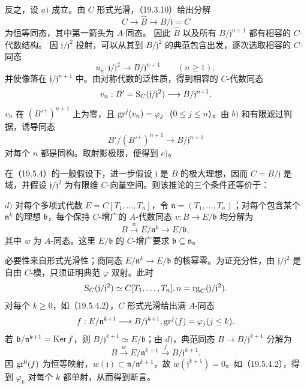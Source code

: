反之，设 $a)$ 成立。由 $C$ 形式光滑，（19.3.10）给出分解
\[
 C\longrightarrow\widehat B\longrightarrow B/\mathfrak j=C
\]
为恒等同态，其中第一箭头为 $A$-同态。
因此 $\widehat B$ 以及所有 $B/\mathfrak j^{n+1}$ 都有相容的 $C$-代数结构。
因 $\mathfrak j/\mathfrak j^2$ 投射，可以从其到 $B/\mathfrak j^2$ 的典范包含出发，逐次选取相容的 $C$-同态
\[
 u_n:\mathfrak j/\mathfrak j^2\longrightarrow B/\mathfrak j^{n+1}
 \qquad(n\geq1),
\]
并使像落在 $\mathfrak j/\mathfrak j^{n+1}$ 中。由对称代数的泛性质，得到相容的 $C$-代数同态
\[
 v_n:B'=\mathrm S_C(\mathfrak j/\mathfrak j^2)\longrightarrow B/\mathfrak j^{n+1}.
\]
$v_n$ 在 $(B'^+)^{n+1}$ 上为零，且 $\operatorname{gr}^j(v_n)=\varphi_j$（$0\leq j\leq n$）。由 $b)$ 和有限滤过判据，诱导同态
\[
 B'/(B'^+)^{n+1}\longrightarrow B/\mathfrak j^{n+1}
\]
对每个 $n$ 都是同构。取射影极限，便得到 $c)$。

在（19.5.4）的一般假设下，进一步假设 $\mathfrak j$ 是 $B$ 的极大理想，因而 $C=B/\mathfrak j$ 是域，并假设 $\mathfrak j/\mathfrak j^2$ 为有限维 $C$-向量空间。则该推论的三个条件还等价于：

$d)$ 对每个多项式代数 $E=C[T_1,\ldots,T_n]$，令 $\mathfrak n=(T_1,\ldots,T_n)$；对每个包含某个 $\mathfrak n^k$ 的理想 $\mathfrak b$，每个保持 $C$-增广的 $A$-代数同态 $v:B\to E/\mathfrak b$ 均分解为
\[
 B\xrightarrow{w}E/\mathfrak n^k\longrightarrow E/\mathfrak b,
\]
其中 $w$ 为 $A$-同态。这里 $E/\mathfrak b$ 的 $C$-增广要求 $\mathfrak b\subseteq\mathfrak n$。

必要性来自形式光滑性；商同态 $E/\mathfrak n^k\to E/\mathfrak b$ 的核幂零。为证充分性，由 $\mathfrak j/\mathfrak j^2$ 是自由 $C$-模，只须证明典范 $\varphi$ 双射。此时
\[
 \mathrm S_C(\mathfrak j/\mathfrak j^2)\simeq C[T_1,\ldots,T_n],
  n=\operatorname{rg}_C(\mathfrak j/\mathfrak j^2).
\]
对每个 $k\geq0$，如（19.5.4.2），$C$ 形式光滑给出满 $A$-同态
\[
 f:E/\mathfrak n^{k+1}\longrightarrow B/\mathfrak j^{k+1},
  \operatorname{gr}^j(f)=\varphi_j(j\leq k).
\]
若 $\mathfrak b/\mathfrak n^{k+1}=\operatorname{Ker} f$，则 $B/\mathfrak j^{k+1}\simeq E/\mathfrak b$；由 $d)$，典范同态 $B\to B/\mathfrak j^{k+1}$ 分解为
\[
 B\xrightarrow{w}E/\mathfrak n^{k+1}\xrightarrow{f}B/\mathfrak j^{k+1}.
\]
因 $\operatorname{gr}^0(f)$ 为恒等映射，$w(\mathfrak j)\subset\mathfrak n/\mathfrak n^{k+1}$，故 $w(\mathfrak j^{k+1})=0$。如（19.5.4.2），得到 $\varphi_k$ 对每个 $k$ 都单射，从而得到断言。

